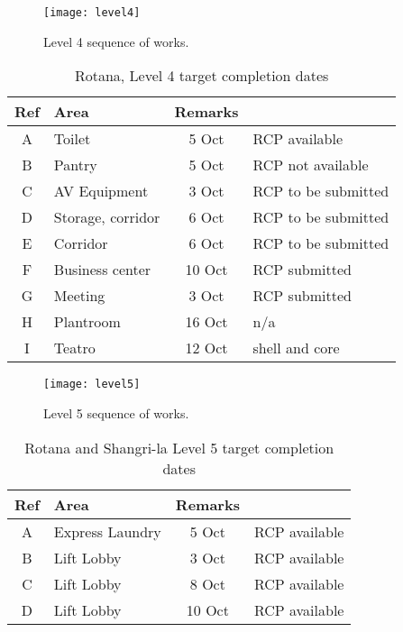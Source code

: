 \begin{figure*}[htbp]
 \texttt{[image: level4]}
  \caption{Level 4 sequence of works.}
  \label{fig:level4}
\end{figure*}
\begin{table}[htbp]
\begin{center}
\begin{tabular}{clcl}
\toprule
Ref  & Area  & Remarks \\
\midrule
A    &Toilet   &5 Oct & RCP available  \\
B     &Pantry  &5 Oct &  RCP not available \\
C     &AV Equipment & 3 Oct &RCP to be submitted  \\
D     &Storage, corridor & 6 Oct & RCP to be submitted \\
E      &Corridor &6 Oct & RCP to be submitted \\
F     &Business center&10 Oct & RCP submitted \\
G    &Meeting &3 Oct & RCP submitted \\
H    &Plantroom &16 Oct & n/a \\
I     &Teatro &12 Oct & shell and core \\
\bottomrule
\end{tabular}
\caption{Rotana,  Level 4  target completion dates}
\end{center}
\end{table}

\begin{figure*}[htbp]
 \texttt{[image: level5]}
  \caption{Level 5 sequence of works.}
  \label{fig:level5}
\end{figure*}
\begin{table}[htbp]
\begin{center}
\begin{tabular}{clcl}
\toprule
Ref  & Area  & Remarks \\
\midrule
A    &Express Laundry   &5 Oct & RCP available  \\
B     &Lift Lobby  &3 Oct &  RCP  available \\
C     &Lift Lobby & 8 Oct &RCP available  \\
D     &Lift Lobby & 10 Oct & RCP available \\
\bottomrule
\end{tabular}
\caption{Rotana and Shangri-la  Level 5  target completion dates}
\end{center}
\end{table}

